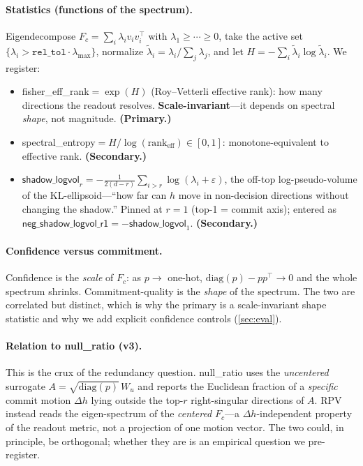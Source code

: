 \documentclass[10pt, letterpaper]{article}
\newcommand{\Fc}{F_{c}}
\newcommand{\Wu}{W_{u}}
\newcommand{\effrank}{\textsf{fisher\_eff\_rank}}
\newcommand{\spent}{\textsf{spectral\_entropy}}
\newcommand{\logvol}{\textsf{shadow\_logvol}}
\newcommand{\nullr}{\textsf{null\_ratio}}
\begin{document}
\paragraph{Statistics (functions of the spectrum).}
Eigendecompose $\Fc=\sum_i\lambda_i v_iv_i^{\top}$ with
$\lambda_1\ge\cdots\ge0$, take the active set
$\{\lambda_i>\texttt{rel\_tol}\cdot\lambda_{\max}\}$, normalize
$\tilde\lambda_i=\lambda_i/\sum_j\lambda_j$, and let
$H=-\sum_i\tilde\lambda_i\log\tilde\lambda_i$. We register:
\begin{itemize}[leftmargin=1.4em, itemsep=2pt, topsep=2pt]
\item \effrank${}=\exp(H)$ (Roy--Vetterli effective rank): how many
directions the readout resolves. \textbf{Scale-invariant}---it depends
on spectral \emph{shape}, not magnitude. \textbf{(Primary.)}
\item \spent${}=H/\log(\mathrm{rank}_{\mathrm{eff}})\in[0,1]$:
monotone-equivalent to effective rank. \textbf{(Secondary.)}
\item $\logvol_r=-\tfrac{1}{2(d-r)}\sum_{i>r}\log(\lambda_i+\varepsilon)$,
the off-top log-pseudo-volume of the KL-ellipsoid---``how far can $h$
move in non-decision directions without changing the shadow.'' Pinned
at $r=1$ (top-1 = commit axis); entered as
$\textsf{neg\_shadow\_logvol\_r1}=-\logvol_1$. \textbf{(Secondary.)}
\end{itemize}

\paragraph{Confidence versus commitment.}
Confidence is the \emph{scale} of $\Fc$: as $p\to$ one-hot,
$\mathrm{diag}(p)-pp^{\top}\to0$ and the whole spectrum shrinks.
Commitment-quality is the \emph{shape} of the spectrum. The two are
correlated but distinct, which is why the primary is a scale-invariant
shape statistic and why we add explicit confidence controls
(\cref{sec:eval}).

\paragraph{Relation to \nullr{} (v3).}
This is the crux of the redundancy question. \nullr{} uses the
\emph{uncentered} surrogate $A=\sqrt{\mathrm{diag}(p)}\,\Wu$ and reports
the Euclidean fraction of a \emph{specific} commit motion $\Delta h$
lying outside the top-$r$ right-singular directions of $A$. RPV instead
reads the eigen-spectrum of the \emph{centered} $\Fc$---a
$\Delta h$-independent property of the readout metric, not a projection
of one motion vector. The two could, in principle, be orthogonal;
whether they are is an empirical question we pre-register.
\end{document}
